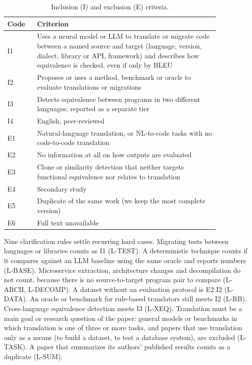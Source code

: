 \begin{table}[t]
  \centering
  \caption{Inclusion (I) and exclusion (E) criteria.}
  \label{tab:criteria}
  \small
  \begin{tabular}{@{}l P{0.86\linewidth}@{}}
    \toprule
    Code & Criterion \\
    \midrule
    I1 & Uses a neural model or LLM to translate or migrate code between a named source and target (language, version, dialect, library or API, framework) and describes how equivalence is checked, even if only by BLEU \\
    I2 & Proposes or uses a method, benchmark or oracle to evaluate translations or migrations \\
    I3 & Detects equivalence between programs in two different languages; reported as a separate tier \\
    I4 & English, peer-reviewed \\
    \midrule
    E1 & Natural-language translation, or NL-to-code tasks with no code-to-code translation \\
    E2 & No information at all on how outputs are evaluated \\
    E3 & Clone or similarity detection that neither targets functional equivalence nor relates to translation \\
    E4 & Secondary study \\
    E5 & Duplicate of the same work (we keep the most complete version) \\
    E6 & Full text unavailable \\
    \bottomrule
  \end{tabular}
\end{table}

Nine clarification rules settle recurring hard cases. Migrating tests between languages or libraries counts as I1 (L-TEST). A deterministic technique counts if it compares against an LLM baseline using the same oracle and reports numbers (L-BASE). Microservice extraction, architecture changes and decompilation do not count, because there is no source-to-target program pair to compare (L-ARCH, L-DECOMP). A dataset without an evaluation protocol is E2 I2 (L-DATA). An oracle or benchmark for rule-based translators still meets I2 (L-RB). Cross-language equivalence detection meets I3 (L-XEQ). Translation must be a main goal or research question of the paper: general models or benchmarks in which translation is one of three or more tasks, and papers that use translation only as a means (to build a dataset, to test a database system), are excluded (L-TASK). A paper that summarizes its authors' published results counts as a duplicate (L-SUM).


